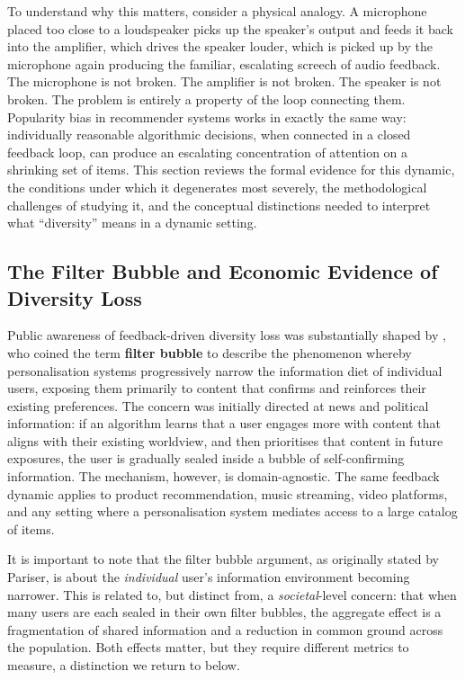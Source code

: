 \documentclass[11pt,a4paper]{report}
\begin{document}
To understand why this matters, consider a physical analogy. A microphone placed too close to a loudspeaker picks up the speaker's output and feeds it back into the amplifier, which drives the speaker louder, which is picked up by the microphone again producing the familiar, escalating screech of audio feedback. The microphone is not broken. The amplifier is not broken. The speaker is not broken. The problem is entirely a property of the loop connecting them. Popularity bias in recommender systems works in exactly the same way: individually reasonable algorithmic decisions, when connected in a closed feedback loop, can produce an escalating concentration of attention on a shrinking set of items. This section reviews the formal evidence for this dynamic, the conditions under which it degenerates most severely, the methodological challenges of studying it, and the conceptual distinctions needed to interpret what ``diversity'' means in a dynamic setting.

\subsection*{The Filter Bubble and Economic Evidence of Diversity Loss}

Public awareness of feedback-driven diversity loss was substantially shaped by \citet{pariser2011filterbubble}, who coined the term \textbf{filter bubble} to describe the phenomenon whereby personalisation systems progressively narrow the information diet of individual users, exposing them primarily to content that confirms and reinforces their existing preferences. The concern was initially directed at news and political information: if an algorithm learns that a user engages more with content that aligns with their existing worldview, and then prioritises that content in future exposures, the user is gradually sealed inside a bubble of self-confirming information. The mechanism, however, is domain-agnostic. The same feedback dynamic applies to product recommendation, music streaming, video platforms, and any setting where a personalisation system mediates access to a large catalog of items.

It is important to note that the filter bubble argument, as originally stated by Pariser, is about the \emph{individual} user's information environment becoming narrower. This is related to, but distinct from, a \emph{societal}-level concern: that when many users are each sealed in their own filter bubbles, the aggregate effect is a fragmentation of shared information and a reduction in common ground across the population. Both effects matter, but they require different metrics to measure, a distinction we return to below.
\end{document}

